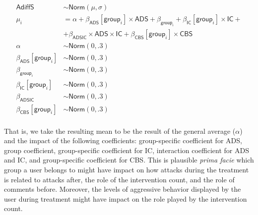 \documentclass[
  10pt,
  dvipsnames, enabledeprecatedfontcommands]{scrartcl}
\begin{document}
\vspace{-2mm}

\begin{align*}
\mathsf{AdiffS} & \sim \textsf{Norm}(\mu, \sigma)\\
\mu_i & = \alpha + \beta_{\mathsf{ADS}}[\mathsf{group}_i]\times \mathsf{ADS} + \beta_{\mathsf{group}_i}  +
 \beta_{\mathsf{IC}}[\mathsf{group}_i]\times \mathsf{IC} + \\
 & + \beta_{\mathsf{ADSIC}}\times \mathsf{ADS} \times \mathsf{IC} + \beta_{\mathsf{CBS}}[\mathsf{group}_i] \times \mathsf{CBS}\\
 \alpha & \sim \textsf{Norm}(0,.3)\\
\beta_{\mathsf{ADS}}[\mathsf{group}_i] & \sim \textsf{Norm}(0,.3)\\
\beta_{\mathsf{group}_i} & \sim \textsf{Norm}(0,.3)\\
\beta_{\mathsf{IC}}[\mathsf{group}_i] & \sim \textsf{Norm}(0,.3)\\
 \beta_{\mathsf{ADSIC}} & \sim \textsf{Norm}(0,.3)\\
 \beta_{\mathsf{CBS}}[\mathsf{group}_i]& \sim \textsf{Norm}(0,.3)\\
\end{align*}

That is, we take the resulting mean to be the result of the general
average (\(\alpha\)) and the impact of the following coefficients:
group-specific coefficient for \textsf{ADS}, group coefficient,
group-specific coefficient for \textsf{IC}, interaction coefficient for
\textsf{ADS} and \textsf{IC}, and group-specific coefficient for
\textsf{CBS}. This is plausible \emph{prima facie} which group a user
belongs to might have impact on how attacks during the treatment is
related to attacks after, the role of the intervention count, and the
role of comments before. Moreover, the levels of aggressive behavior
displayed by the user during treatment might have impact on the role
played by the intervention count.

\vspace{1mm}
\footnotesize
\end{document}
